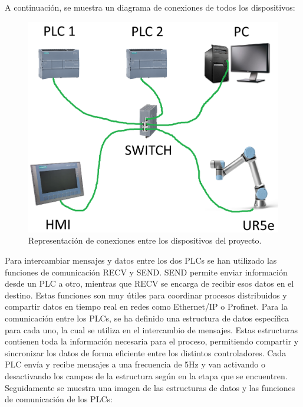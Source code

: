 A continuación, se muestra un diagrama de conexiones de todos los dispositivos:

\begin{figure} [h!]
  \begin{center}
    \includegraphics[width=15cm]{figs/conexion_dispositivos}
  \end{center}
  \caption{\centering Representación de conexiones entre los dispositivos del proyecto.}
  \label{fig:conexion_dispositivos}
\end{figure} 

Para intercambiar mensajes y datos entre los dos PLCs se han utilizado las funciones de comunicación RECV y SEND. SEND permite enviar información desde un PLC a otro, mientras que RECV se encarga de recibir esos datos en el destino. Estas funciones son muy útiles para coordinar procesos distribuidos y compartir datos en tiempo real en redes como Ethernet/IP o Profinet. Para la comunicación entre los PLCs, se ha definido una estructura de datos específica para cada uno, la cual se utiliza en el intercambio de mensajes. Estas estructuras contienen toda la información necesaria para el proceso, permitiendo compartir y sincronizar los datos de forma eficiente entre los distintos controladores. Cada PLC envía y recibe mensajes a una frecuencia de 5Hz y van activando o desactivando los campos de la estructura según en la etapa que se encuentren. Seguidamente se muestra una imagen de las estructuras de datos y las funciones de comunicación de los PLCs:

